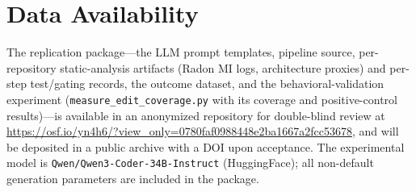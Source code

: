 \documentclass[runningheads]{llncs}
\begin{document}
\section*{Data Availability}

The replication package---the LLM prompt templates, pipeline source, per-repository static-analysis artifacts (Radon MI logs, architecture proxies) and per-step test/gating records, the outcome dataset, and the behavioral-validation experiment (\texttt{measure\_edit\_coverage.py} with its coverage and positive-control results)---is available in an anonymized repository for double-blind review at \url{https://osf.io/yn4h6/?view_only=0780faf0988448e2ba1667a2fcc53678}, and will be deposited in a public archive with a DOI upon acceptance. The experimental model is \texttt{Qwen/Qwen3-Coder-34B-Instruct} (HuggingFace); all non-default generation parameters are included in the package.


\end{document}

